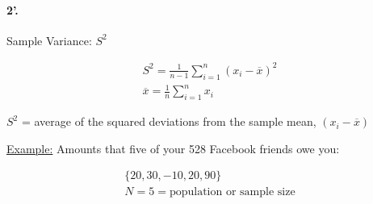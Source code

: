 \documentclass[../Notes.tex]{subfiles}
\begin{document}
    \pagebreak

    \paragraph*{2'.} Sample Variance: $S^2$
    
    \begin{equation*}
        \begin{gathered}
            S^2 = \frac{1}{n-1}\sum\limits_{i=1}^{n}(x_i-\overline{x})^2    \\
            \overline{x}=\frac{1}{n}\sum\limits_{i=1}^{n}x_i
        \end{gathered}
    \end{equation*}        

    $S^2$ = average of the squared deviations from the sample mean, $(x_i-\overline{x})$

    \underline{Example:} Amounts that five of your 528 Facebook friends owe you: 
    
    \begin{equation*}
        \begin{gathered}
            \{ 20, 30, -10, 20, 90 \}                   \\
            N = 5 = \text{population or sample size}    \\
        \end{gathered}
    \end{equation*}

    \horizontal
\end{document}
